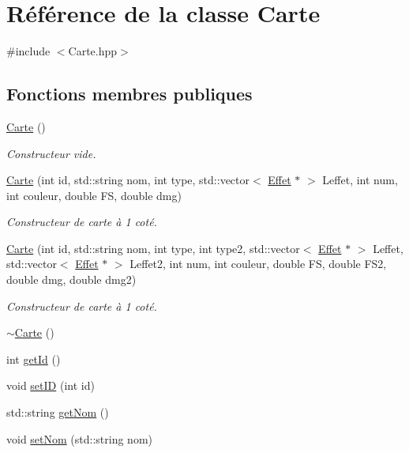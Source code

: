 \hypertarget{class_carte}{\section{Référence de la classe Carte}
\label{class_carte}
}


{\ttfamily \#include $<$Carte.\-hpp$>$}

\subsection*{Fonctions membres publiques}
\begin{DoxyCompactItemize}
\item 
\hyperlink{class_carte_a06daaca86c31c80f8308f4a81d46dc9b}{Carte} ()
\begin{DoxyCompactList}\small\item\em Constructeur vide. \end{DoxyCompactList}\item 
\hyperlink{class_carte_a5a1e7bd0334c6cf52ba8991c3a019815}{Carte} (int id, std\-::string nom, int type, std\-::vector$<$ \hyperlink{class_effet}{Effet} $\ast$ $>$ Leffet, int num, int couleur, double F\-S, double dmg)
\begin{DoxyCompactList}\small\item\em Constructeur de carte à 1 coté. \end{DoxyCompactList}\item 
\hyperlink{class_carte_a9fbd39e6a9da16692854ce076ee1a007}{Carte} (int id, std\-::string nom, int type, int type2, std\-::vector$<$ \hyperlink{class_effet}{Effet} $\ast$ $>$ Leffet, std\-::vector$<$ \hyperlink{class_effet}{Effet} $\ast$ $>$ Leffet2, int num, int couleur, double F\-S, double F\-S2, double dmg, double dmg2)
\begin{DoxyCompactList}\small\item\em Constructeur de carte à 1 coté. \end{DoxyCompactList}\item 
\hyperlink{class_carte_a63300ff55c58b5d5b1674a3fc8f25910}{$\sim$\-Carte} ()
\item 
int \hyperlink{class_carte_ae51a40df8fb2ab5498ae67e165ceb5f2}{get\-Id} ()
\item 
void \hyperlink{class_carte_a1aad4c6854631a3de71210d33c15e258}{set\-I\-D} (int id)
\item 
std\-::string \hyperlink{class_carte_a7b68885ddbd8c8f6991e5447346913bc}{get\-Nom} ()
\item 
void \hyperlink{class_carte_a90596fd46a269874d7473afe9733869a}{set\-Nom} (std\-::string nom)

\end{DoxyCompactItemize}
